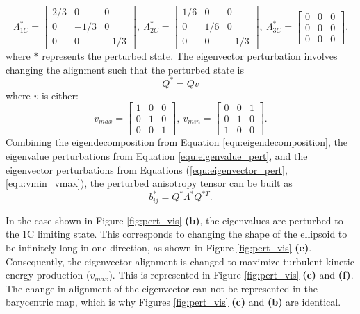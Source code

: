 \begin{equation}\label{equ:eigenvalue_pert}
    \Lambda^*_{1C} = 
    \begin{bmatrix}
    2/3 & 0    & 0 \\
    0   & -1/3 & 0 \\
    0   & 0    & -1/3
    \end{bmatrix},~
    \Lambda^*_{2C} = 
    \begin{bmatrix}
    1/6 & 0   & 0 \\
    0   & 1/6 & 0 \\
    0   & 0   & -1/3
    \end{bmatrix},~
    \Lambda^*_{3C} = 
    \begin{bmatrix}
    0 & 0 & 0 \\
    0 & 0 & 0 \\
    0 & 0 & 0
    \end{bmatrix}.
\end{equation}
where $*$ represents the perturbed state. The eigenvector perturbation involves changing the alignment such that the perturbed state is
\begin{equation}\label{equ:eigenvector_pert}
    Q^* = Qv
\end{equation}
where $v$ is either:
\begin{equation}\label{equ:vmin_vmax}
    v_{max} = 
    \begin{bmatrix}
    1 & 0 & 0 \\
    0 & 1 & 0 \\
    0 & 0 & 1
    \end{bmatrix},~
    v_{min} = 
    \begin{bmatrix}
    0 & 0 & 1 \\
    0 & 1 & 0 \\
    1 & 0 & 0
    \end{bmatrix}.
\end{equation}
Combining the eigendecomposition from Equation \eqref{equ:eigendecomposition}, the eigenvalue perturbations from Equation \eqref{equ:eigenvalue_pert}, and the eigenvector perturbations from Equations (\ref{equ:eigenvector_pert}, \ref{equ:vmin_vmax}), the perturbed anisotropy tensor can be built as
\begin{equation}
    b^*_{ij}=Q^* \Lambda^* Q^{*T}.
\end{equation}

In the case shown in Figure \ref{fig:pert_vis} \textbf{(b)}, the eigenvalues are perturbed to the 1C limiting state. This corresponds to changing the shape of the ellipsoid to be infinitely long in one direction, as shown in Figure \ref{fig:pert_vis} \textbf{(e)}. Consequently, the eigenvector alignment is changed to maximize turbulent kinetic energy production ($v_{max}$). This is represented in Figure \ref{fig:pert_vis} \textbf{(c)} and \textbf{(f)}. The change in alignment of the eigenvector can not be represented in the barycentric map, which is why Figures \ref{fig:pert_vis} \textbf{(c)} and \textbf{(b)} are identical.

